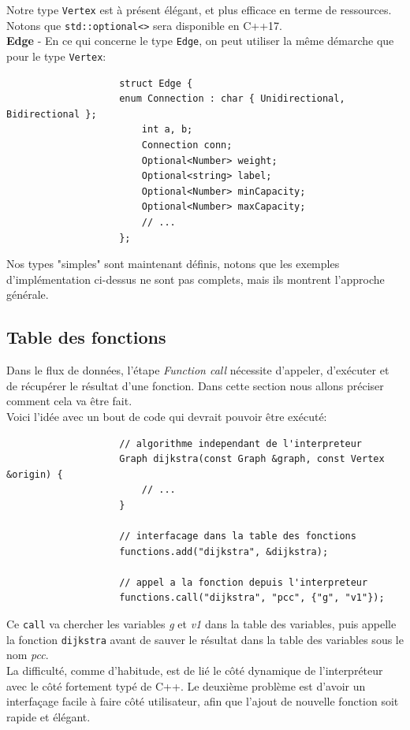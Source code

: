 \documentclass[french]{article}
\begin{document}
		Notre type \texttt{Vertex} est à présent élégant, et plus efficace en terme de ressources. Notons que \texttt{std::optional<>} sera disponible en C++17.\\
		
		\textbf{Edge} - En ce qui concerne le type \texttt{Edge}, on peut utiliser la même démarche que pour le type \texttt{Vertex}:
		
		\begin{lstlisting}
					struct Edge {
					enum Connection : char { Unidirectional, Bidirectional };
						int a, b;
						Connection conn;
						Optional<Number> weight;
						Optional<string> label;
						Optional<Number> minCapacity;
						Optional<Number> maxCapacity;
						// ...
					};
		\end{lstlisting}
		
		Nos types "simples" sont maintenant définis, notons que les exemples d'implémentation ci-dessus ne sont pas complets, mais ils montrent l'approche générale.
		
		\subsection{Table des fonctions}
		\label{subsec:table-des-fonctions}
		Dans le flux de données, l'étape \textit{Function call} nécessite d'appeler, d'exécuter et de récupérer le résultat d'une fonction. Dans cette section nous allons préciser comment cela va être fait.\\
		
		Voici l'idée avec un bout de code qui devrait pouvoir être exécuté:
		
		\begin{lstlisting}
					// algorithme independant de l'interpreteur
					Graph dijkstra(const Graph &graph, const Vertex &origin) {
						// ...
					}
					
					// interfacage dans la table des fonctions
					functions.add("dijkstra", &dijkstra);
					
					// appel a la fonction depuis l'interpreteur
					functions.call("dijkstra", "pcc", {"g", "v1"});
		\end{lstlisting}
		
		Ce \texttt{call} va chercher les variables \textit{g} et \textit{v1} dans la table des variables, puis appelle la fonction \texttt{dijkstra} avant de sauver le résultat dans la table des variables sous le nom \textit{pcc}.\\
		
		La difficulté, comme d'habitude, est de lié le côté dynamique de l'interpréteur avec le côté fortement typé de C++. Le deuxième problème est d'avoir un interfaçage facile à faire côté utilisateur, afin que l'ajout de nouvelle fonction soit rapide et élégant.\\
		
\end{document}
